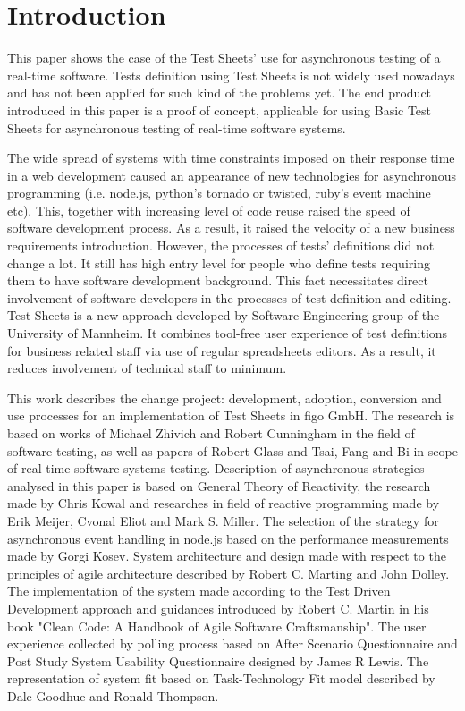 \chapter{Introduction}
\label{chap:intro}
This paper shows the case of the Test Sheets' use for asynchronous testing of a real-time software. Tests definition using Test Sheets is not widely used nowadays and has not been applied for such kind of the problems yet.
The end product introduced in this paper is a proof of concept,  applicable for using Basic Test Sheets for asynchronous testing of real-time software systems.

The wide spread of systems with time constraints imposed on their response time in a web development caused an appearance of new technologies for asynchronous programming (i.e. node.js, python's tornado or twisted, ruby's event machine etc). 
This, together with increasing level of code reuse raised the speed of software development process.
As a result, it raised the velocity of a new business requirements introduction.
However, the processes of tests' definitions did not change a lot. 
It still has high entry level for people who define tests requiring them to have software development background.
This fact necessitates direct involvement of software developers in the processes of test definition and editing.
Test Sheets is a new approach developed by Software Engineering group of the University of Mannheim. 
It combines  tool-free user experience of test definitions for business related staff via use of regular spreadsheets editors.
As a result, it reduces involvement of technical staff to minimum.


This work describes the change project: development, adoption, conversion and use processes for an implementation of Test Sheets in figo GmbH. The research is based on works of Michael Zhivich and Robert Cunningham in the field of software testing, as well as papers of Robert Glass and Tsai, Fang  and Bi in scope of real-time software systems testing.
Description of asynchronous strategies analysed in this paper is based on General Theory of Reactivity, the research made by Chris Kowal and researches in field of reactive programming made by Erik Meijer, Cvonal Eliot and Mark S. Miller. 
The selection of the strategy for asynchronous event handling in node.js based on the performance measurements made by Gorgi Kosev. 
System  architecture and design made with respect to the principles of agile architecture described by Robert  C. Marting and John Dolley. 
The implementation of the system made according to the Test Driven Development approach and guidances introduced by Robert C. Martin in his book "Clean Code: A Handbook of Agile Software Craftsmanship".
The user experience collected by polling process based on After Scenario Questionnaire and Post Study System Usability Questionnaire designed by James R Lewis.
The representation of system fit based on Task-Technology Fit model described by Dale Goodhue and Ronald Thompson.

